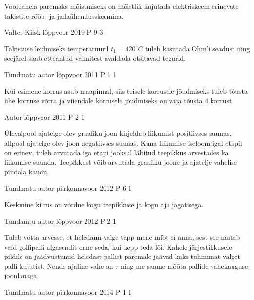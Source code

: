\documentclass[11pt]{article}
\begin{document}
{{\ifHint
Vooluahela paremaks mõistmiseks on mõistlik kujutada elektriskeem erinevate takistite rööp- ja jadaühendusskeemina.
\fi
}

{Valter Kiisk} %
{lõppvoor} %
{2019} %
{P 9} %
{3} %
{

\ifHint
Takistuse leidmiseks temperatuuril $t_1 = 420 ^{\circ}C$ tuleb kasutada Ohm'i seadust ning seejärel saab etteantud valmitest avaldada otsitavad tegurid.
\fi
}

{Tundmatu autor} %
{lõppvoor} %
{2011} %
{P 1} %
{1} %
{

\ifHint
Kui esimene korrus asub maapinnal, siis teisele korrusele jõudmiseks tuleb tõusta ühe korruse võrra ja viiendale korrusele jõudmiseks on vaja tõusta $4$ korrust.
\fi
}


{Autor} %
{lõppvoor} %
{2011} %
{P 2} %
{1} %
{

\ifHint
Ülevalpool ajatelge olev graafiku joon kirjeldab liikumist positiivses suunas, allpool ajatelge olev joon negatiivses suunas. Kuna liikumise iseloom igal etapil on erinev, tuleb arvutada iga etapi jooksul läbitud teepikkus arvestades ka liikumise suunda. Teepikkust võib arvutada graafiku joone ja ajatelje vahelise pindala kaudu.
\fi
}



{Tundmatu autor} %
{piirkonnavoor} %
{2012} %
{P 6} %
{1} %
{

\ifHint
Keskmine kiirus on võrdne kogu teepikkuse ja kogu aja jagatisega.
\fi
}


{Tundamtu autor} %
{lõppvoor} %
{2012} %
{P 2} %
{1} %
{

\ifHint
Tuleb võtta arvesse, et heledaim valge täpp meile infot ei anna, sest see näitab vaid golfipalli algasendit enne seda, kui kepp teda lõi. Kahele järjestikkusele pildile on jäädvustunud heledast pallist paremale jäävad kaks tuhmimat valget palli kujutist. Nende ajaline vahe on $\tau$ ning me saame mõõta pallide vahekauguse joonlauaga.
\fi
}


{Tundmatu autor} %
{piirkonnavoor} %
{2014} %
{P 1} %
{1} %
{

}}
\end{document}
